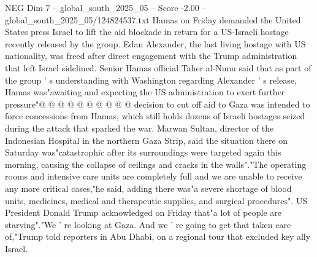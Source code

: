 \begin{textsample}{NEG Dim 7 – global\_south\_2025\_05 – Score -2.00 – global\_south\_2025\_05/124824537.txt}
Hamas on Friday demanded the United States press Israel to lift the aid blockade in return for a US-Israeli hostage recently released by the group.
Edan Alexander, the last living hostage with US nationality, was freed after direct engagement with the Trump administration that left Israel sidelined.
Senior Hamas official Taher al-Nunu said that as part of the group ' s understanding with Washington regarding Alexander ' s release, Hamas was"awaiting and expecting the US administration to exert further pressure"@ @ @ @ @ @ @ @ @ @ decision to cut off aid to Gaza was intended to force concessions from Hamas, which still holds dozens of Israeli hostages seized during the attack that sparked the war.
Marwan Sultan, director of the Indonesian Hospital in the northern Gaza Strip, said the situation there on Saturday was"catastrophic after its surroundings were targeted again this morning, causing the collapse of ceilings and cracks in the walls"."The operating rooms and intensive care units are completely full and we are unable to receive any more critical cases,"he said, adding there was"a severe shortage of blood units, medicines, medical and therapeutic supplies, and surgical procedures".
US President Donald Trump acknowledged on Friday that"a lot of people are starving"."We ' re looking at Gaza.
And we ' re going to get that taken care of,"Trump told reporters in Abu Dhabi, on a regional tour that excluded key ally Israel.

\end{textsample}
